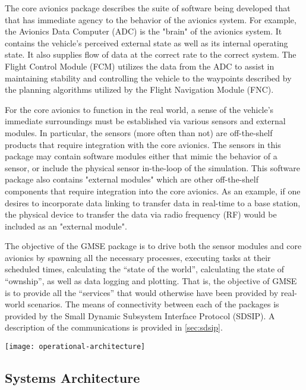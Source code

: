 The core avionics package describes the suite of software being developed that that has immediate
agency to the behavior of the avionics system. For example, the Avionics Data Computer (ADC) is the
"brain" of the avionics system. It contains the vehicle's perceived external state as well as its
internal operating state. It also supplies flow of data at the correct rate to the correct system.
The Flight Control Module (FCM) utilizes the data from the ADC to assist in maintaining stability
and controlling the vehicle to the waypoints described by the planning algorithms utilized by the
Flight Navigation Module (FNC).

For the core avionics to function in the real world, a sense of the vehicle's immediate surroundings
must be established via various sensors and external modules. In particular, the sensors (more often
than not) are off-the-shelf products that require integration with the core avionics. The sensors in
this package may contain software modules either that mimic the behavior of a sensor, or include the
physical sensor in-the-loop of the simulation. This software package also contains "external
modules" which are other off-the-shelf components that require integration into the core avionics.
As an example, if one desires to incorporate data linking to transfer data in real-time to a base
station, the physical device to transfer the data via radio frequency (RF) would be included as an
"external module".

The objective of the GMSE package is to drive both the sensor modules and core avionics by spawning
all the necessary processes, executing tasks at their scheduled times, calculating the ``state of
the world'', calculating the state of ``ownship'', as well as data logging and plotting. That is,
the objective of GMSE is to provide all the ``services'' that would otherwise have been provided by
real-world scenarios. The means of connectivity between each of the packages is provided by the
Small Dynamic Subsystem Interface Protocol (SDSIP). A description of the communications is provided
in \autoref{sec:sdsip}.

\begin{figure*}[ht]
\texttt{[image: operational-architecture]}
\caption{}
\label{fig:operational-architecture}
\end{figure*}

\subsection{Systems Architecture} \label{sec:systems-architecture}

